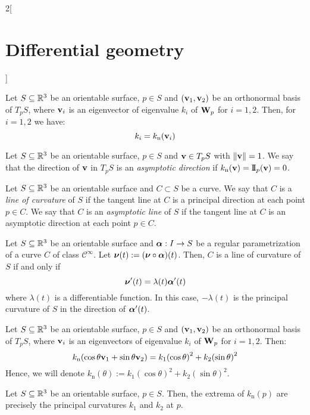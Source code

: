 \documentclass[../../../main.tex]{subfiles}
\begin{document}
\begin{multicols}{2}[\section{Differential geometry}]
\begin{definition}
  \end{definition}
  \begin{proposition}
    Let $S\subseteq\mathbb{R}^3$ be an orientable surface, $p\in S$ and $(\boldsymbol{\mathrm{v}}_1,\boldsymbol{\mathrm{v}}_2)$ be an orthonormal basis of $T_pS$, where $\boldsymbol{\mathrm{v}}_i$ is an eigenvector of eigenvalue $k_i$ of $\boldsymbol{\mathrm{W}}_p$ for $i=1,2$. Then, for $i=1,2$ we have: $$k_i=k_\text{n}(\boldsymbol{\mathrm{v}}_i)$$
  \end{proposition}
  \begin{definition}
    Let $S\subseteq\mathbb{R}^3$ be an orientable surface, $p\in S$ and $\boldsymbol{\mathrm{v}}\in T_pS$ with $\|\boldsymbol{\mathrm{v}}\|=1$. We say that the direction of $\boldsymbol{\mathrm{v}}$ in $T_pS$ is an \emph{asymptotic direction} if $k_\text{n}(\boldsymbol{\mathrm{v}})=\mathrm{I\!I}_p(\boldsymbol{\mathrm{v}})=0$.
  \end{definition}
  \begin{definition}
    Let $S\subseteq\mathbb{R}^3$ be an orientable surface and $C\subset S$ be a curve. We say that $C$ is a \emph{line of curvature} of $S$ if the tangent line at $C$ is a principal direction at each point $p\in C$. We say that $C$ is an \emph{asymptotic line} of $S$ if the tangent line at $C$ is an asymptotic direction at each point $p\in C$.
  \end{definition}
  \begin{proposition}
    Let $S\subseteq\mathbb{R}^3$ be an orientable surface and $\boldsymbol{\mathrm{\alpha}}:I\rightarrow S$ be a regular parametrization of a curve $C$ of class $\mathcal{C}^\infty$. Let $\boldsymbol{\mathrm{\nu}}(t):=(\boldsymbol{\mathrm{\nu}}\circ\boldsymbol{\mathrm{\alpha}})(t)$. Then, $C$ is a line of curvature of $S$ if and only if $$\boldsymbol{\mathrm{\nu}}'(t)=\lambda(t)\boldsymbol{\mathrm{\alpha}}'(t)$$ where $\lambda(t)$ is a differentiable function. In this case, $-\lambda(t)$ is the principal curvature of $S$ in the direction of $\boldsymbol{\mathrm{\alpha}}'(t)$.
  \end{proposition}
  \begin{proposition}
    Let $S\subseteq\mathbb{R}^3$ be an orientable surface, $p\in S$ and $(\boldsymbol{\mathrm{v}}_1,\boldsymbol{\mathrm{v}}_2)$ be an orthonormal basis of $T_pS$, where $\boldsymbol{\mathrm{v}}_i$ is an eigenvectors of eigenvalue $k_i$ of $\boldsymbol{\mathrm{W}}_p$ for $i=1,2$. Then: $$k_\text{n}(\cos\theta \boldsymbol{\mathrm{v}}_1+\sin\theta \boldsymbol{\mathrm{v}}_2)=k_1{\left(\cos\theta\right)}^2+k_2{\left(\sin\theta\right)}^2$$
    Hence, we will denote $k_\text{n}(\theta):=k_1{\left(\cos\theta\right)}^2+k_2{\left(\sin\theta\right)}^2$.
  \end{proposition}
  \begin{corollary}
    Let $S\subseteq\mathbb{R}^3$ be an orientable surface, $p\in S$. Then, the extrema of $k_\text{n}(p)$ are precisely the principal curvatures $k_1$ and $k_2$ at $p$.

\end{corollary}
\end{multicols}
\end{document}
